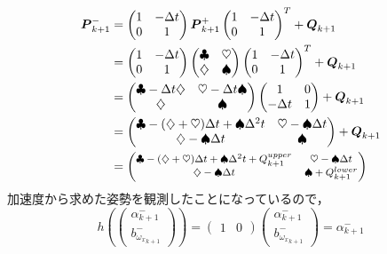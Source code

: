 \begin{align}
  \boldsymbol{P}_{k+1}^{-}
  &=
  \begin{pmatrix}
    1 & -\Delta t\\
    0 & 1
  \end{pmatrix}
  \boldsymbol{P}_{k+1}^{+}
  \begin{pmatrix}
    1 & -\Delta t\\
    0 & 1
  \end{pmatrix}^{T} +
  \boldsymbol{Q}_{k+1}\\
  &=
  \begin{pmatrix}
    1 & -\Delta t\\
    0 & 1
  \end{pmatrix}
  \begin{pmatrix}
    \clubsuit & \heartsuit\\
    \diamondsuit & \spadesuit
  \end{pmatrix}
  \begin{pmatrix}
    1 & -\Delta t\\
    0 & 1
  \end{pmatrix}^{T} +
  \boldsymbol{Q}_{k+1}\\
  &=
  \begin{pmatrix}
    \clubsuit - \Delta t \diamondsuit & \heartsuit - \Delta t \spadesuit\\
    \diamondsuit & \spadesuit
  \end{pmatrix}
  \begin{pmatrix}
    1 & 0\\
    -\Delta t & 1
  \end{pmatrix} +
  \boldsymbol{Q}_{k+1}\\
  &=
  \begin{pmatrix}
    \clubsuit - (\diamondsuit + \heartsuit) \Delta t + \spadesuit \Delta^2 t & \heartsuit - \spadesuit \Delta t\\
    \diamondsuit - \spadesuit \Delta t & \spadesuit
  \end{pmatrix} +
  \boldsymbol{Q}_{k+1}\\
  &=
  {\footnotesize
    \begin{pmatrix}
      \clubsuit - (\diamondsuit + \heartsuit) \Delta t + \spadesuit \Delta^2 t + Q^{upper}_{k+1} & \heartsuit - \spadesuit \Delta t\\
      \diamondsuit - \spadesuit \Delta t & \spadesuit + Q^{lower}_{k+1}
    \end{pmatrix}
  }
\end{align}
加速度から求めた姿勢を観測したことになっているので，
\begin{equation}
  h(\begin{pmatrix}
    \alpha_{k+1}^{-}\\
    b_{{\omega_x}_{k+1}}^{-}
  \end{pmatrix}) =
  \begin{pmatrix}
    1 & 0
  \end{pmatrix}
  \begin{pmatrix}
    \alpha_{k+1}^{-}\\
    b_{{\omega_x}_{k+1}}^{-}
  \end{pmatrix} =
  \alpha_{k+1}^{-}
\end{equation}

